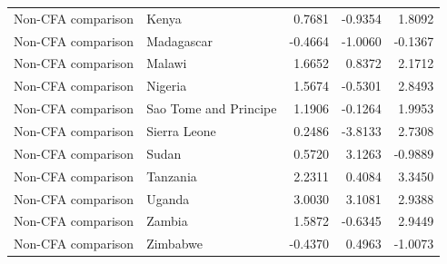 \begin{table}
\begin{tabular}[t]{llrrr}
Non-CFA comparison & Kenya & 0.7681 & -0.9354 & 1.8092\\
\addlinespace
Non-CFA comparison & Madagascar & -0.4664 & -1.0060 & -0.1367\\
Non-CFA comparison & Malawi & 1.6652 & 0.8372 & 2.1712\\
Non-CFA comparison & Nigeria & 1.5674 & -0.5301 & 2.8493\\
Non-CFA comparison & Sao Tome and Principe & 1.1906 & -0.1264 & 1.9953\\
Non-CFA comparison & Sierra Leone & 0.2486 & -3.8133 & 2.7308\\
\addlinespace
Non-CFA comparison & Sudan & 0.5720 & 3.1263 & -0.9889\\
Non-CFA comparison & Tanzania & 2.2311 & 0.4084 & 3.3450\\
Non-CFA comparison & Uganda & 3.0030 & 3.1081 & 2.9388\\
Non-CFA comparison & Zambia & 1.5872 & -0.6345 & 2.9449\\
Non-CFA comparison & Zimbabwe & -0.4370 & 0.4963 & -1.0073\\
\bottomrule
\end{tabular}
\end{table}